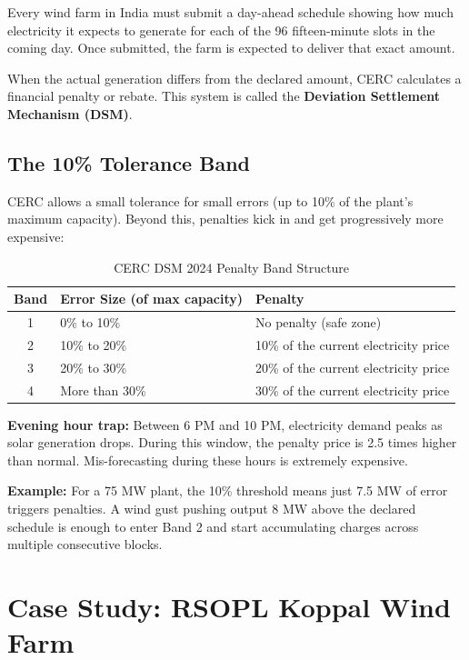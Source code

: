 \documentclass[12pt,a4paper]{report}
\begin{document}
Every wind farm in India must submit a day-ahead schedule showing how much electricity it expects to generate for each of the 96 fifteen-minute slots in the coming day. Once submitted, the farm is expected to deliver that exact amount.

When the actual generation differs from the declared amount, CERC calculates a financial penalty or rebate. This system is called the \textbf{Deviation Settlement Mechanism (DSM)}.

\subsection{The 10\% Tolerance Band}

CERC allows a small tolerance for small errors (up to 10\% of the plant's maximum capacity). Beyond this, penalties kick in and get progressively more expensive:

\begin{table}[H]
    \centering
    \caption{CERC DSM 2024 Penalty Band Structure}
    \begin{tabular}{cll}
        \toprule
        \textbf{Band} & \textbf{Error Size (of max capacity)} & \textbf{Penalty} \\
        \midrule
        1 & 0\% to 10\% & No penalty (safe zone) \\
        2 & 10\% to 20\% & 10\% of the current electricity price \\
        3 & 20\% to 30\% & 20\% of the current electricity price \\
        4 & More than 30\% & 30\% of the current electricity price \\
        \bottomrule
    \end{tabular}
\end{table}

\textbf{Evening hour trap:} Between 6 PM and 10 PM, electricity demand peaks as solar generation drops. During this window, the penalty price is 2.5 times higher than normal. Mis-forecasting during these hours is extremely expensive.

\textbf{Example:} For a 75 MW plant, the 10\% threshold means just 7.5 MW of error triggers penalties. A wind gust pushing output 8 MW above the declared schedule is enough to enter Band 2 and start accumulating charges across multiple consecutive blocks.

\section{Case Study: RSOPL Koppal Wind Farm}
\end{document}
